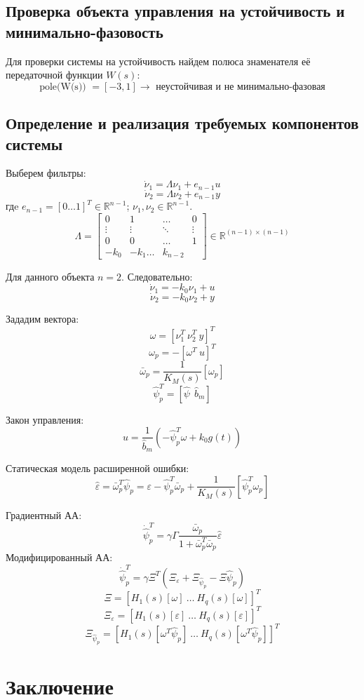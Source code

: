 \documentclass{article}
\begin{document}
\subsection{Проверка объекта управления на устойчивость и минимально-фазовость}
Для проверки системы на устойчивость найдем полюса знаменателя её передаточной функции \(W(s)\):
\[\text{pole(W(s)) } = [-3, 1] \rightarrow \text{ неустойчивая и не минимально-фазовая}\]

\subsection{Определение и реализация требуемых компонентов системы}
Выберем фильтры:
\[\dot \nu_1 = \Lambda \nu_1 + e_{n-1}u\]
\[\dot \nu_2 = \Lambda \nu_2 + e_{n-1}y\]
гдe \(e_{n-1} = [0 \hdots 1]^T \in \mathds{R}^{n-1}\); \(\nu_1, \nu_2 \in \mathds{R}^{n-1}\).
\[\Lambda = \begin{bmatrix}
  0 & 1 & \hdots & 0 \\
  \vdots & \vdots & \ddots & \vdots \\
  0 & 0 & \hdots & 1 \\
  -k_0 & -k_1 \hdots & k_{n- 2}
\end{bmatrix} \in \mathds{R}^{(n-1) \times (n-1)} \]

Для данного объекта \(n=2\). Следовательно:
\[\dot \nu_1 = -k_0 \nu_1 + u\]
\[\dot \nu_2 = -k_0 \nu_2 + y\]

Зададим вектора:
\[\omega = [\nu_1^T~\nu_2^T~y]^T\]
\[\omega_p = -[\omega^T~u]^T\]
\[\bar \omega_p = \frac{1}{K_M(s)}[\omega_p]\]
\[\hat{\psi}_p^T = [\hat \psi ~~ \hat b_m] \]

Закон управления:
\[u = \frac{1}{\hat{b}_m}(-\hat{\psi}_p^T \omega + k_0 g(t)) \]

Статическая модель расширенной ошибки:
\[\hat \varepsilon = \bar \omega_p^T \hat{\psi}_p =  \varepsilon - \hat{\psi}_p^T \bar \omega_p + \frac{1}{K_M(s)}[ \hat{\psi}_p^T \omega_p]\]

Градиентный АА:
\[\dot {\hat{\psi}}_p^T = \gamma \Gamma \frac{\bar \omega_p}{1 + \bar \omega_p^T \bar \omega_p} \hat \varepsilon\]
Модифицированный АА:
\[\dot {\hat{\psi}}_p^T = \gamma \Xi^T (\Xi_\varepsilon + \Xi_{\hat{\psi}_p} - \Xi \hat{\psi}_p)\]
\[\Xi = [H_1(s)[\omega]~\dots~H_q(s)[\omega]]^T\]
\[\Xi_\varepsilon = [H_1(s)[\varepsilon]~\dots~H_q(s)[\varepsilon]]^T\]
\[\Xi_{\hat{\psi}_p}  = [H_1(s)[\omega^T \hat{\psi}_p ]~\dots~H_q(s)[\omega^T \hat{\psi}_p ]]^T\]



\FloatBarrier



\newpage
\section{Заключение}
\end{document}
